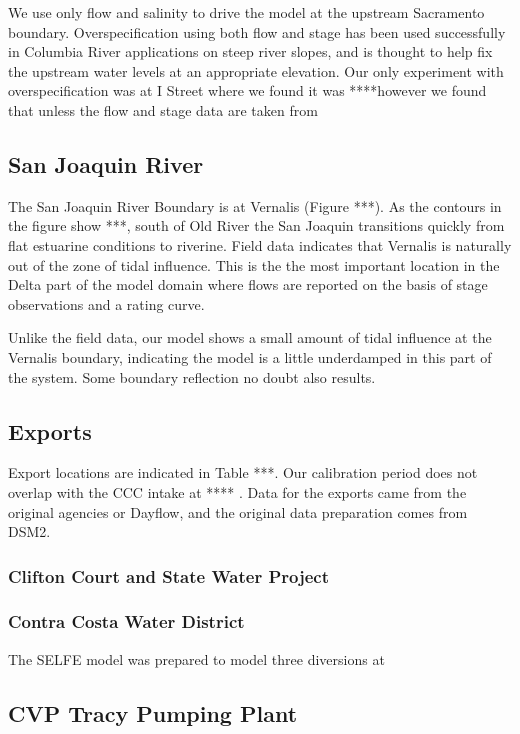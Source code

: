We use only flow and salinity to drive the model at the upstream Sacramento boundary. Overspecification using both flow and stage has been used successfully in Columbia River applications on steep river slopes, and is thought to help fix the upstream water levels at an appropriate elevation. Our only experiment with overspecification was at I Street where we found it was ****however we found that unless the flow and stage data are taken from 

\subsection{San Joaquin River}
The San Joaquin River Boundary is at Vernalis (Figure ***). As the contours in the figure show ***, south of Old River the San Joaquin transitions quickly from flat estuarine conditions to riverine. Field data indicates that Vernalis is naturally out of the zone of tidal influence. This is the the most important location in the Delta part of the model domain where flows are reported on the basis of stage observations and a rating curve. 

Unlike the field data, our model shows a small amount of tidal influence at the Vernalis boundary, indicating the model is a little underdamped in this part of the system. Some boundary reflection no doubt also results.

\subsection{Exports}
Export locations are indicated in Table ***. Our calibration period does not overlap with the CCC intake at **** . Data for the exports came from the original agencies or Dayflow, and the original data preparation comes from DSM2.

\subsubsection{Clifton Court and State Water Project}


\subsubsection{Contra Costa Water District}
The SELFE model was prepared to model three diversions at 


\subsection{CVP Tracy Pumping Plant}



